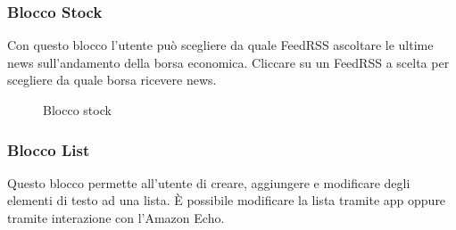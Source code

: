 \subsubsection{Blocco Stock}
Con questo blocco l'utente può scegliere da quale FeedRSS ascoltare le ultime news sull'andamento della borsa economica.
Cliccare su un FeedRSS a scelta per scegliere da quale borsa ricevere news.
\begin{figure}[!ht]
	\centering
	\caption{Blocco stock}
\end{figure}
\newpage
\subsubsection{Blocco List}
Questo blocco permette all'utente di creare, aggiungere e modificare degli elementi di testo ad una lista.
È possibile modificare la lista tramite app oppure tramite interazione con l'Amazon Echo.

